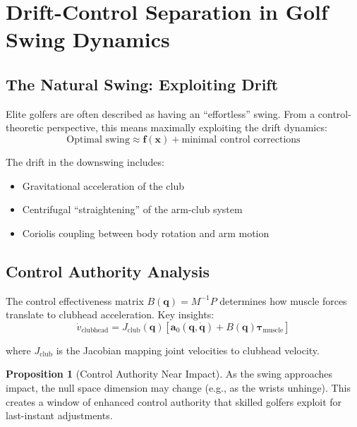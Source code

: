 \documentclass[11pt,a4paper]{article}
\theoremstyle{definition}
\newtheorem{proposition}[theorem]{Proposition}
\newcommand{\qvec}{\bm{q}}
\newcommand{\xvec}{\bm{x}}
\newcommand{\fvec}{\bm{f}}
\newcommand{\avec}{\bm{a}}
\newcommand{\tauvec}{\bm{\tau}}
\begin{document}
\section{Drift-Control Separation in Golf Swing Dynamics}

\subsection{The Natural Swing: Exploiting Drift}

Elite golfers are often described as having an ``effortless'' swing. From a control-theoretic perspective, this means maximally exploiting the drift dynamics:
\begin{equation}
    \text{Optimal swing} \approx \fvec(\xvec) + \text{minimal control corrections}
\end{equation}

The drift in the downswing includes:
\begin{itemize}[noitemsep]
    \item Gravitational acceleration of the club
    \item Centrifugal ``straightening'' of the arm-club system
    \item Coriolis coupling between body rotation and arm motion
\end{itemize}

\subsection{Control Authority Analysis}

The control effectiveness matrix $B(\qvec) = M^{-1} P$ determines how muscle forces translate to clubhead acceleration. Key insights:
\begin{equation}
    \dot{v}_{\text{clubhead}} = J_{\text{club}}(\qvec) \left[ \avec_0(\qvec, \dot{\qvec}) + B(\qvec) \tauvec_{\text{muscle}} \right]
\end{equation}

where $J_{\text{club}}$ is the Jacobian mapping joint velocities to clubhead velocity.

\begin{proposition}[Control Authority Near Impact]
As the swing approaches impact, the null space dimension may change (e.g., as the wrists unhinge). This creates a window of enhanced control authority that skilled golfers exploit for last-instant adjustments.
\end{proposition}
\end{document}
